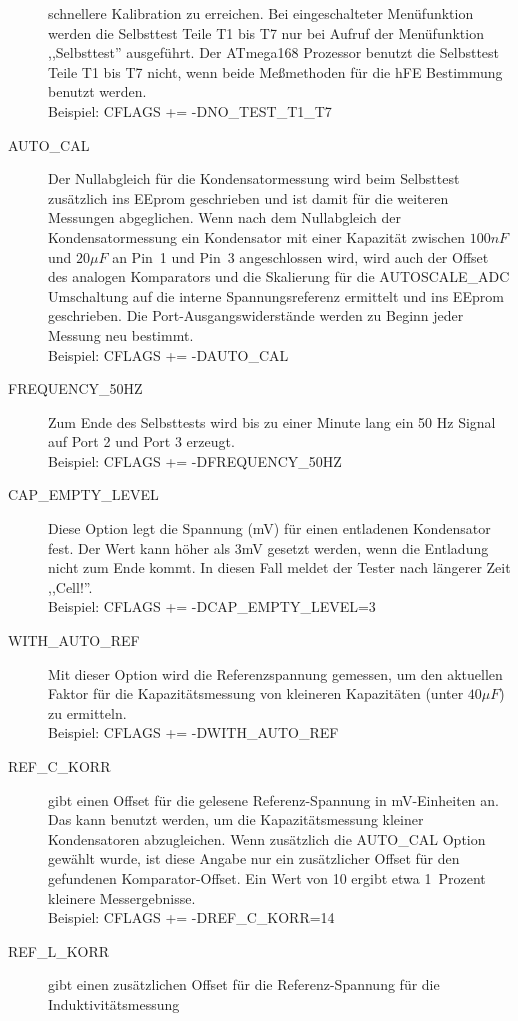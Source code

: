 \begin{description}
schnellere Kalibration zu erreichen.
Bei eingeschalteter Menüfunktion werden die Selbsttest Teile T1 bis T7 nur bei Aufruf der Menüfunktion ,,Selbsttest'' ausgeführt.
Der ATmega168 Prozessor benutzt die Selbsttest Teile T1 bis T7 nicht, wenn beide Meßmethoden für die hFE Bestimmung benutzt werden.\\
Beispiel: CFLAGS += -DNO\_TEST\_T1\_T7
  \item[AUTO\_CAL] Der Nullabgleich für die Kondensatormessung wird beim
Selbsttest zusätzlich ins EEprom geschrieben und ist damit für die weiteren Messungen abgeglichen.
Wenn nach dem Nullabgleich der Kondensatormessung ein Kondensator mit einer Kapazität zwischen \(100 nF\) und \(20 \mu F\) an Pin~1 und Pin~3 
angeschlossen wird, wird auch der Offset des analogen Komparators und die Skalierung für die AUTOSCALE\_ADC
Umschaltung auf die interne Spannungsreferenz ermittelt und ins EEprom geschrieben.
Die Port-Ausgangswiderstände werden zu Beginn jeder Messung neu bestimmt. \\
Beispiel: CFLAGS += -DAUTO\_CAL
  \item[FREQUENCY\_50HZ] Zum Ende des Selbsttests wird bis zu einer Minute lang ein 50 Hz Signal auf Port 2 und Port 3 erzeugt.\\
Beispiel: CFLAGS += -DFREQUENCY\_50HZ
  \item[CAP\_EMPTY\_LEVEL] Diese Option legt die Spannung (mV) für einen entladenen Kondensator fest.
Der Wert kann höher als 3mV gesetzt werden, wenn die Entladung nicht zum Ende kommt. In diesen Fall meldet der Tester nach längerer Zeit ,,Cell!''.\\
Beispiel: CFLAGS += -DCAP\_EMPTY\_LEVEL=3
  \item[WITH\_AUTO\_REF] Mit dieser Option wird die Referenzspannung gemessen, um den aktuellen Faktor für die Kapazitätsmessung 
von kleineren Kapazitäten (unter \(40\mu F\)) zu ermitteln.\\
Beispiel: CFLAGS += -DWITH\_AUTO\_REF
  \item[REF\_C\_KORR] gibt einen Offset für die gelesene Referenz-Spannung in mV-Einheiten an.
Das kann benutzt werden, um die Kapazitätsmessung kleiner Kondensatoren abzugleichen.
Wenn zusätzlich die AUTO\_CAL Option gewählt wurde, ist diese Angabe nur ein zusätzlicher Offset für
den gefundenen Komparator-Offset.
Ein Wert von 10 ergibt etwa 1~Prozent kleinere Messergebnisse.\\
Beispiel: CFLAGS += -DREF\_C\_KORR=14
  \item[REF\_L\_KORR] gibt einen zusätzlichen Offset für die Referenz-Spannung für die Induktivitätsmessung

\end{description}
